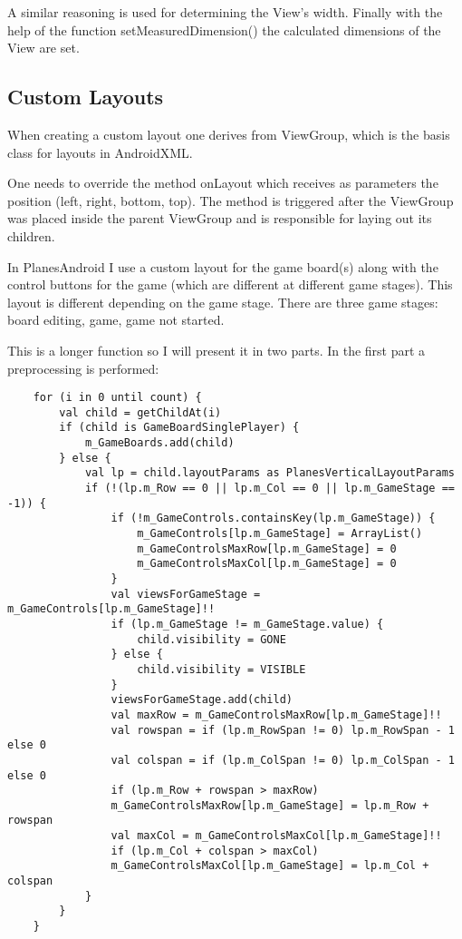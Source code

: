 A similar reasoning is used for determining the View's width. Finally with the help of the function setMeasuredDimension() the calculated dimensions of the View are set.

\subsection {Custom Layouts} \label{custom_layouts}

When creating a custom layout one derives from ViewGroup, which is the basis class for layouts in AndroidXML.

One needs to override the method onLayout which receives as parameters the position (left, right, bottom, top). The method is triggered after the ViewGroup was placed inside the parent ViewGroup and is responsible for laying out its children.

In PlanesAndroid I use a custom layout for the game board(s) along with the control buttons for the game (which are different at different game stages). This layout is different depending on the game stage. There are three game stages: board editing, game, game not started.

This is a longer function so I will present it in two parts. In the first part a preprocessing is performed:

\begin{lstlisting}
	for (i in 0 until count) {
		val child = getChildAt(i)
		if (child is GameBoardSinglePlayer) {
			m_GameBoards.add(child)
		} else {
			val lp = child.layoutParams as PlanesVerticalLayoutParams
			if (!(lp.m_Row == 0 || lp.m_Col == 0 || lp.m_GameStage == -1)) {
				if (!m_GameControls.containsKey(lp.m_GameStage)) {
					m_GameControls[lp.m_GameStage] = ArrayList()
					m_GameControlsMaxRow[lp.m_GameStage] = 0
					m_GameControlsMaxCol[lp.m_GameStage] = 0
				}
				val viewsForGameStage = m_GameControls[lp.m_GameStage]!!
				if (lp.m_GameStage != m_GameStage.value) {
					child.visibility = GONE
				} else {
					child.visibility = VISIBLE
				}
				viewsForGameStage.add(child)
				val maxRow = m_GameControlsMaxRow[lp.m_GameStage]!!
				val rowspan = if (lp.m_RowSpan != 0) lp.m_RowSpan - 1 else 0
				val colspan = if (lp.m_ColSpan != 0) lp.m_ColSpan - 1 else 0
				if (lp.m_Row + rowspan > maxRow)
				m_GameControlsMaxRow[lp.m_GameStage] = lp.m_Row + rowspan
				val maxCol = m_GameControlsMaxCol[lp.m_GameStage]!!
				if (lp.m_Col + colspan > maxCol)
				m_GameControlsMaxCol[lp.m_GameStage] = lp.m_Col + colspan
			}
		}
	}
\end{lstlisting}


